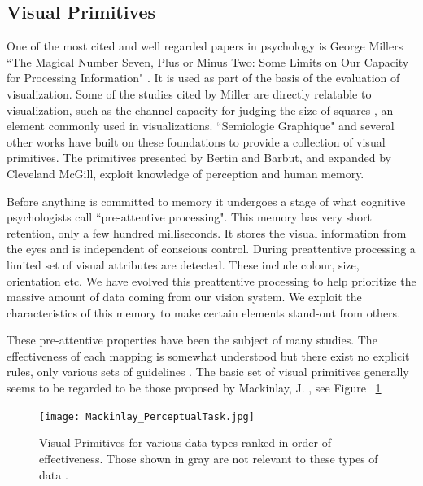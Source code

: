 \documentclass[a4paper, 10pt, titlepage, twocolumn, onehalfspace]{article}
\begin{document}
\subsection{Visual Primitives}
One of the most cited and well regarded papers in psychology is George Millers ``The Magical Number Seven, Plus or Minus Two: Some Limits on Our Capacity for Processing Information" \cite{Mil56}. It is used as part of the basis of the evaluation of visualization. Some of the studies cited by Miller are directly relatable to visualization, such as the channel capacity for judging the size of squares \cite{eriksen1955absolute}, an element commonly used in visualizations. ``Semiologie Graphique" \cite{bertin1973semiologie} and several other works have built on these foundations to provide a collection of visual primitives. The primitives presented by Bertin and Barbut, and expanded by Cleveland McGill, exploit knowledge of perception and human memory. 

Before anything is committed to memory it undergoes a stage of what cognitive psychologists call ``pre-attentive processing". This memory has very short retention, only a few hundred milliseconds. It stores the visual information from the eyes and is independent of conscious control. During preattentive processing a limited set of visual attributes are detected. These include colour, size, orientation etc. We have evolved this preattentive processing to help prioritize the massive amount of data coming from our vision system. We exploit the characteristics of this memory to make certain elements stand-out from others.

These pre-attentive properties have been the subject of many studies. The effectiveness of each mapping is somewhat understood but there exist no explicit rules, only various sets of guidelines \cite{few2004show}. The basic set of visual primitives generally seems to be regarded to be those proposed by Mackinlay, J. \cite{mackinlay1986automating}, see Figure ~\ref{fig:jock}


\begin{figure}[hbt]
  \begin{center}
    \texttt{[image: Mackinlay\_PerceptualTask.jpg]}
  \end{center}
  \caption{\small Visual Primitives for various data types ranked in order of effectiveness. Those shown in gray are not relevant to these types of data \cite{mackinlay1986automating}.}
  \label{fig:jock}
\end{figure}
\end{document}
